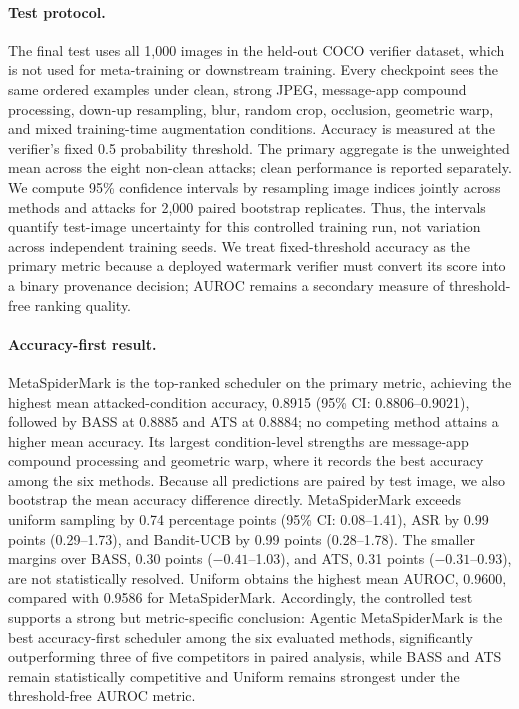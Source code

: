 \paragraph{Test protocol.}
The final test uses all 1,000 images in the held-out COCO verifier dataset, which is not used for meta-training or downstream training.
Every checkpoint sees the same ordered examples under clean, strong JPEG, message-app compound processing, down-up resampling, blur, random crop, occlusion, geometric warp, and mixed training-time augmentation conditions.
Accuracy is measured at the verifier's fixed 0.5 probability threshold.
The primary aggregate is the unweighted mean across the eight non-clean attacks; clean performance is reported separately.
We compute 95\% confidence intervals by resampling image indices jointly across methods and attacks for 2,000 paired bootstrap replicates.
Thus, the intervals quantify test-image uncertainty for this controlled training run, not variation across independent training seeds.
We treat fixed-threshold accuracy as the primary metric because a deployed watermark verifier must convert its score into a binary provenance decision; AUROC remains a secondary measure of threshold-free ranking quality.



\paragraph{Accuracy-first result.}
MetaSpiderMark is the top-ranked scheduler on the primary metric, achieving the highest mean attacked-condition accuracy, 0.8915 (95\% CI: 0.8806--0.9021), followed by BASS at 0.8885 and ATS at 0.8884; no competing method attains a higher mean accuracy.
Its largest condition-level strengths are message-app compound processing and geometric warp, where it records the best accuracy among the six methods.
Because all predictions are paired by test image, we also bootstrap the mean accuracy difference directly.
MetaSpiderMark exceeds uniform sampling by 0.74 percentage points (95\% CI: 0.08--1.41), ASR by 0.99 points (0.29--1.73), and Bandit-UCB by 0.99 points (0.28--1.78).
The smaller margins over BASS, 0.30 points ($-0.41$--1.03), and ATS, 0.31 points ($-0.31$--0.93), are not statistically resolved.
Uniform obtains the highest mean AUROC, 0.9600, compared with 0.9586 for MetaSpiderMark.
Accordingly, the controlled test supports a strong but metric-specific conclusion: Agentic MetaSpiderMark is the best accuracy-first scheduler among the six evaluated methods, significantly outperforming three of five competitors in paired analysis, while BASS and ATS remain statistically competitive and Uniform remains strongest under the threshold-free AUROC metric.

